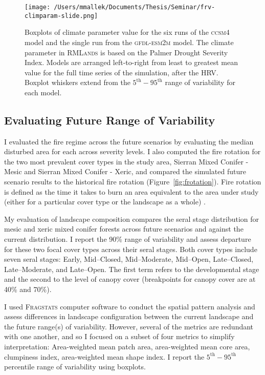 \begin{figure}[!htbp]
\centering
\texttt{[image: /Users/mmallek/Documents/Thesis/Seminar/frv-climparam-slide.png]}
\caption{Boxplots of climate parameter value for the six runs of the \textsc{ccsm4} model and the single run from the \textsc{gfdl-esm2m} model. The climate parameter in \textsc{RMLands} is based on the Palmer Drought Severity Index. Models are arranged left-to-right from least to greatest mean value for the full time series of the simulation, after the HRV. Boxplot whiskers extend from the $5^{\text{th}}-95^{\text{th}}$ range of variability for each model.}
\label{pdsi-boxplots}
\end{figure}


\subsection*{Evaluating Future Range of Variability}
I evaluated the fire regime across the future scenarios by evaluating the median disturbed area for each across severity levels. %
I also computed the fire rotation for the two most prevalent cover types in the study area, Sierran Mixed Conifer - Mesic and Sierran Mixed Conifer - Xeric, and compared the simulated future scenario results to the historical fire rotation (Figure~\ref{fig:frotation}). Fire rotation is defined as the time it takes to burn an area equivalent to the area under study (either for a particular cover type or the landscape as a whole) \citep{Agee1993}.%
%


My evaluation of landscape composition compares the seral stage distribution for mesic and xeric mixed conifer forests across future scenarios and against the current distribution. I report the 90\% range of variability and assess departure for these two focal cover types across their seral stages. Both cover types include seven seral stages: Early, Mid--Closed, Mid--Moderate, Mid--Open, Late--Closed, Late--Moderate, and Late--Open. The first term refers to the developmental stage and the second to the level of canopy cover (breakpoints for canopy cover are at 40\% and 70\%).


%
I used \textsc{Fragstats} computer software \citep{Fragstats2012} to conduct the spatial pattern analysis and assess differences in landscape configuration between the current landscape and the future range(s) of variability. However, several of the metrics are redundant with one another, and so I focused on a subset of four metrics to simplify interpretation: Area-weighted mean patch area, area-weighted mean core area, clumpiness index, area-weighted mean shape index. I report the $5^{\text{th}}-95^{\text{th}}$ percentile range of variability using boxplots. %

